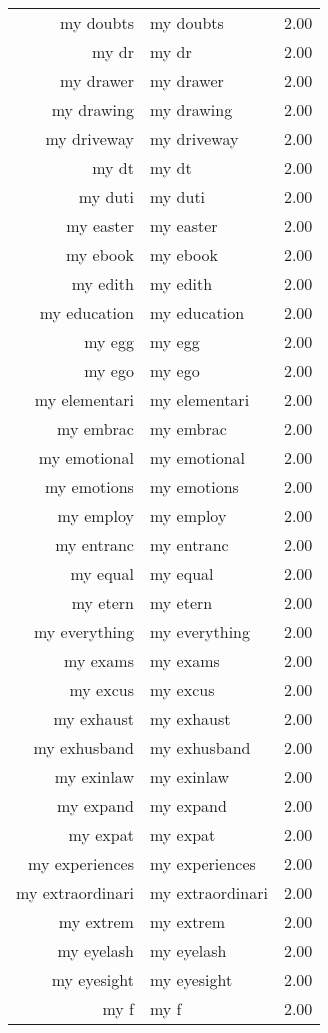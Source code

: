 \begin{table}[ht]
\begin{tabular}{rlr}
  my doubts & my doubts & 2.00 \\ 
  my dr & my dr & 2.00 \\ 
  my drawer & my drawer & 2.00 \\ 
  my drawing & my drawing & 2.00 \\ 
  my driveway & my driveway & 2.00 \\ 
  my dt & my dt & 2.00 \\ 
  my duti & my duti & 2.00 \\ 
  my easter & my easter & 2.00 \\ 
  my ebook & my ebook & 2.00 \\ 
  my edith & my edith & 2.00 \\ 
  my education & my education & 2.00 \\ 
  my egg & my egg & 2.00 \\ 
  my ego & my ego & 2.00 \\ 
  my elementari & my elementari & 2.00 \\ 
  my embrac & my embrac & 2.00 \\ 
  my emotional & my emotional & 2.00 \\ 
  my emotions & my emotions & 2.00 \\ 
  my employ & my employ & 2.00 \\ 
  my entranc & my entranc & 2.00 \\ 
  my equal & my equal & 2.00 \\ 
  my etern & my etern & 2.00 \\ 
  my everything & my everything & 2.00 \\ 
  my exams & my exams & 2.00 \\ 
  my excus & my excus & 2.00 \\ 
  my exhaust & my exhaust & 2.00 \\ 
  my exhusband & my exhusband & 2.00 \\ 
  my exinlaw & my exinlaw & 2.00 \\ 
  my expand & my expand & 2.00 \\ 
  my expat & my expat & 2.00 \\ 
  my experiences & my experiences & 2.00 \\ 
  my extraordinari & my extraordinari & 2.00 \\ 
  my extrem & my extrem & 2.00 \\ 
  my eyelash & my eyelash & 2.00 \\ 
  my eyesight & my eyesight & 2.00 \\ 
  my f & my f & 2.00 \\ 

\end{tabular}
\end{table}
